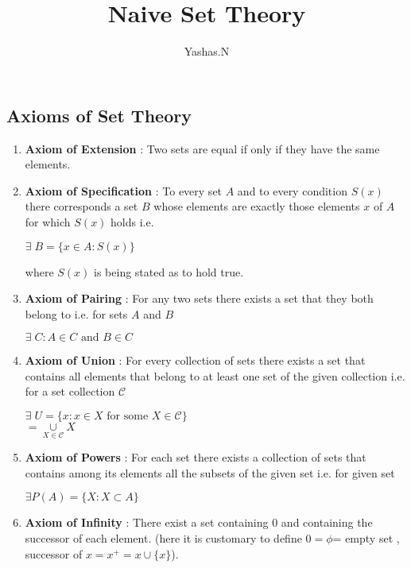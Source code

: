 \documentclass[11pt]{extarticle}
\author{Yashas.N}
\title{Naive Set Theory}
\date{}
\newcommand{\w}[1]{\text{#1}}
\begin{document}
	\maketitle
	\boldmath
	
\begin{multicols}{2}
	\tableofcontents
	
\section{Axioms of Set Theory }
\begin{enumerate}
	\item \textbf{Axiom of Extension} : Two sets are equal if only if they have the same elements.
	\item \textbf{Axiom of Specification} : To every set $A$ and to every condition $S(x)$ there corresponds a set $B$ whose elements are exactly those elements $x$ of $A$ for which $S(x)$ holds i.e.
	\begin{center}
		$\exists \; B=\{x\in A:S(x)\}$
	\end{center}
	where $S(x)$ is being stated as to hold true.
	\item \textbf{Axiom of Pairing} : For any two sets there exists a set that they both belong to i.e. for sets $A$ and $B$
	\begin{center}
		$\exists \; C : A\in C \w{ and } B\in C $
	\end{center}
	\item \textbf{Axiom of Union} : For every collection of sets there exists a set that contains all elements that belong to at least one set of the given collection i.e. for a set collection $\mathscr{C}$ 
	\begin{center}
		$\exists \; U =\{ x: x\in X \w{ for some }X \in \mathscr{C}\}$\\
		$= \underset{X\in \mathscr{C}}{\cup} X$
	\end{center}
	\item \textbf{Axiom of Powers} : For each set there exists a collection of sets that contains among its elements all the subsets of the given set i.e. 
	for given set 
	\begin{center}
		$\exists P(A)=\{X:X\subset A\}$
	\end{center}
	\item \textbf{Axiom of Infinity} : There exist a set containing $0$ and containing the successor of each element. (here it is customary to define $0=\phi$= empty set , successor of $x=x^+=x \cup \{x\}$).
	

\end{enumerate}
\end{multicols}
\end{document}
